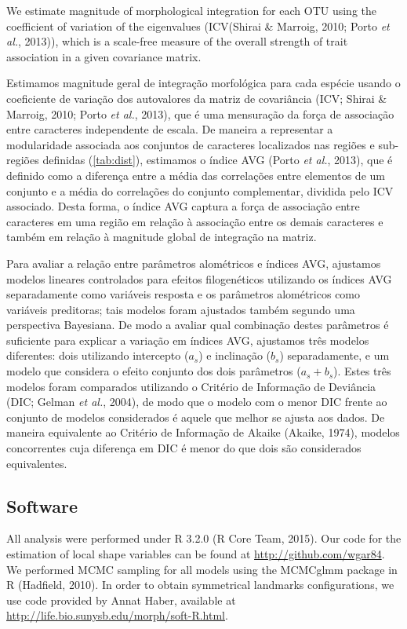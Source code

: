 \documentclass[11pt,twoside]{report}
\begin{document}
We estimate magnitude of morphological integration for each OTU using
the coefficient of variation of the eigenvalues (ICV(Shirai \& Marroig,
2010; Porto \emph{et al.}, 2013)), which is a scale-free measure of the
overall strength of trait association in a given covariance matrix.

Estimamos magnitude geral de integração morfológica para cada espécie
usando o coeficiente de variação dos autovalores da matriz de
covariância (ICV; Shirai \& Marroig, 2010; Porto \emph{et al.}, 2013),
que é uma mensuração da força de associação entre caracteres
independente de escala. De maneira a representar a modularidade
associada aos conjuntos de caracteres localizados nas regiões e
sub-regiões definidas (\autoref{tab:dist}), estimamos o índice AVG
(Porto \emph{et al.}, 2013), que é definido como a diferença entre a
média das correlações entre elementos de um conjunto e a média do
correlações do conjunto complementar, dividida pelo ICV associado. Desta
forma, o índice AVG captura a força de associação entre caracteres em
uma região em relação à associação entre os demais caracteres e também
em relação à magnitude global de integração na matriz.

Para avaliar a relação entre parâmetros alométricos e índices AVG,
ajustamos modelos lineares controlados para efeitos filogenéticos
utilizando os índices AVG separadamente como variáveis resposta e os
parâmetros alométricos como variáveis preditoras; tais modelos foram
ajustados também segundo uma perspectiva Bayesiana. De modo a avaliar
qual combinação destes parâmetros é suficiente para explicar a variação
em índices AVG, ajustamos três modelos diferentes: dois utilizando
intercepto ($a_s$) e inclinação ($b_s$) separadamente, e um modelo que
considera o efeito conjunto dos dois parâmetros ($a_s + b_s$). Estes
três modelos foram comparados utilizando o Critério de Informação de
Deviância (DIC; Gelman \emph{et al.}, 2004), de modo que o modelo com o
menor DIC frente ao conjunto de modelos considerados é aquele que melhor
se ajusta aos dados. De maneira equivalente ao Critério de Informação de
Akaike (Akaike, 1974), modelos concorrentes cuja diferença em DIC é
menor do que dois são considerados equivalentes.

\subsection{Software}\label{software-1}

All analysis were performed under R 3.2.0 (R Core Team, 2015). Our code
for the estimation of local shape variables can be found at
\url{http://github.com/wgar84}. We performed MCMC sampling for all
models using the MCMCglmm package in R (Hadfield, 2010). In order to
obtain symmetrical landmarks configurations, we use code provided by
Annat Haber, available at
\url{http://life.bio.sunysb.edu/morph/soft-R.html}.
\end{document}
